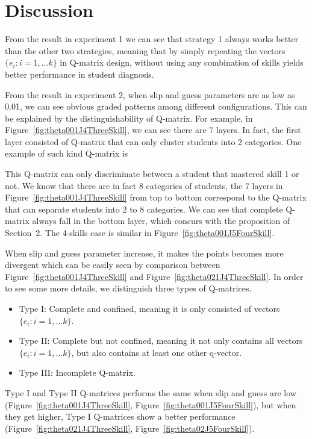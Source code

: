 \documentclass{edm_template}
\newcommand{\Michel}[1]{{\textcolor{red}{[#1]}}}
\begin{document}
%  

\section{Discussion}
From the result in experiment 1 we can see that strategy 1 always works better than the other two strategies, meaning that by simply repeating the vectors $\{e_{i}:i=1,...k\}$ in Q-matrix design, without using any combination of skills yields better performance in student diagnosis. %

From the result in experiment 2, when slip and guess parameters are as low as 0.01, we can see obvious graded patterns among different configurations. This can be explained by the distinguishability of Q-matrix. For example, in Figure~\ref{fig:theta001J4ThreeSkill}, we can see there are 7 layers. In fact, the first layer consisted of Q-matrix that can only cluster students into 2 categories. One example of such kind Q-matrix is

This Q-matrix can only discriminate between a student that mastered skill 1 or not. We know that there are in fact 8 categories of students, the 7 layers in Figure~\ref{fig:theta001J4ThreeSkill} from top to bottom correspond to the Q-matrix that can separate students into 2 to 8 categories. We can see that complete Q-matrix always fall in the bottom layer, which concurs with the proposition of Section~2. The 4-skills case is similar in Figure~\ref{fig:theta001J5FourSkill}.

When slip and guess parameter increase, it makes the points becomes more divergent which can be easily seen by comparison between Figure~\ref{fig:theta001J4ThreeSkill} and Figure~\ref{fig:theta021J4ThreeSkill}. In order to see some more details, we distinguish three types of Q-matrices. 
\begin{itemize}
\item Type I: Complete and confined, meaning it is only consisted of vectors $\{e_{i}:i=1,...k\}$.
\item Type II: Complete but not confined, meaning it not only contains all vectors $\{e_{i}:i=1,...k\}$, but also contains at least one other q-vector.
\item Type III: Incomplete Q-matrix.
\end{itemize}
Type I and Type II Q-matrices performs the same when slip and guess are low (Figure~\ref{fig:theta001J4ThreeSkill}, Figure~\ref{fig:theta001J5FourSkill}), but when they get higher, Type I Q-matrices show a better performance (Figure~\ref{fig:theta021J4ThreeSkill}, Figure~\ref{fig:theta02J5FourSkill}).
\end{document}
